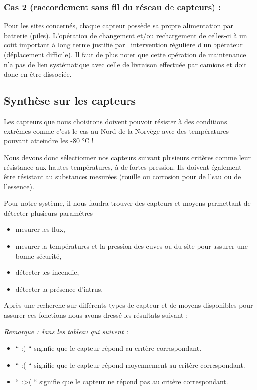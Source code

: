 \documentclass{mise_en_page}
\begin{document}
\subsubsection{Cas 2 (raccordement sans fil du réseau de capteurs) :}

Pour les sites concernés, chaque capteur possède sa propre alimentation
par batterie (piles). L’opération de changement et/ou rechargement de
celles-ci à un coût important à long terme justifié par l’intervention
régulière d’un opérateur (déplacement difficile). Il faut de plus noter
que cette opération de maintenance n’a pas de lien systématique avec
celle de livraison effectuée par camions et doit donc en être
dissociée.

\subsection{Synthèse sur les capteurs}

Les capteurs que nous choisirons doivent pouvoir résister à des
conditions extrêmes comme c’est le cas au Nord de la Norvège avec des
températures pouvant atteindre les -80 °C !

Nous devons donc sélectionner nos capteurs suivant plusieurs critères
comme leur résistance aux hautes températures, à de fortes pression.
Ils doivent également être résistant au substances mesurées (rouille ou
corrosion pour de l’eau ou de l’essence).




Pour notre système, il nous faudra trouver des capteurs et moyens
permettant de détecter plusieurs paramètres

\begin{itemize}
\item mesurer les flux, 
\item mesurer la températures et la pression des cuves ou du site pour
assurer une bonne sécurité,
\item détecter les incendie,
\item détecter la présence d’intrus.
\end{itemize}



Après une recherche sur différents types de capteur et de moyens
disponibles pour assurer ces fonctions nous avons dressé les résultats
suivant :

\emph{Remarque : dans les tableau qui suivent :}
\begin{itemize}
\item  “ :) “ signifie que le capteur répond au critère correspondant.
\item  “ :( “ signifie que le capteur répond moyennement au critère
correspondant.
\item  “ :{\textgreater}( “ signifie que le capteur ne répond pas au
critère correspondant.
\end{itemize}
\end{document}
